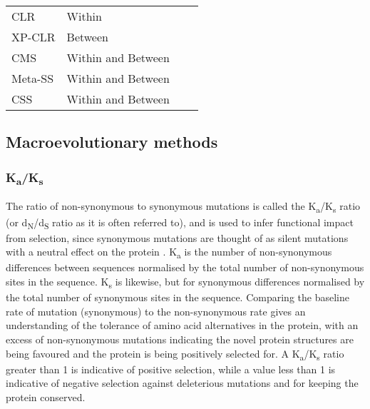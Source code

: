 \documentclass[]{report}
\begin{document}
\begin{table}
\begin{tabular}[t]{l>{\raggedright\arraybackslash}p{10em}ll}
\hspace{1em}CLR & Within &  & \citet{Kim2002}\\
\hspace{1em}XP-CLR & Between &  & \citet{Chen2010}\\
\hspace{1em}CMS & Within and Between &  & \citet{Grossman2010}\\
\hspace{1em}Meta-SS & Within and Between &  & \citet{Utsunomiya2015}\\
\hspace{1em}CSS & Within and Between &  & \citet{Randhawa2014}\\
\bottomrule
\end{tabular}
\end{table}

\subsection{Macroevolutionary methods}\label{macroevolutionary-methods}

\subsubsection{\texorpdfstring{K\textsubscript{a}/K\textsubscript{s}}{Ka/Ks}}\label{kaks}

The ratio of non-synonymous to synonymous mutations is called the
K\textsubscript{a}/K\textsubscript{s} ratio (or
d\textsubscript{N}/d\textsubscript{S} ratio as it is often referred to),
and is used to infer functional impact from selection, since synonymous
mutations are thought of as silent mutations with a neutral effect on
the protein \citep{Hughes1988}. K\textsubscript{a} is the number of
non-synonymous differences between sequences normalised by the total
number of non-synonymous sites in the sequence. K\textsubscript{s} is
likewise, but for synonymous differences normalised by the total number
of synonymous sites in the sequence. Comparing the baseline rate of
mutation (synonymous) to the non-synonymous rate gives an understanding
of the tolerance of amino acid alternatives in the protein, with an
excess of non-synonymous mutations indicating the novel protein
structures are being favoured and the protein is being positively
selected for. A K\textsubscript{a}/K\textsubscript{s} ratio greater than
1 is indicative of positive selection, while a value less than 1 is
indicative of negative selection against deleterious mutations and for
keeping the protein conserved.
\end{document}
